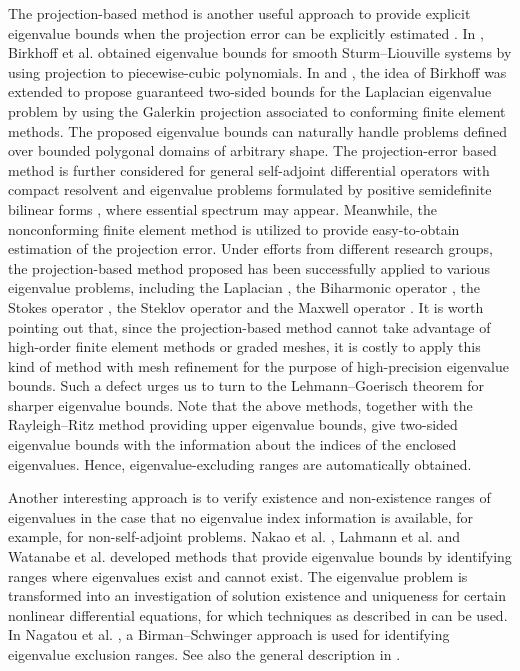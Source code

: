 \documentclass[a4,11pt]{article}
\numberwithin{equation}{section}
\begin{document}
The projection-based method is another useful approach to provide explicit eigenvalue bounds when the projection error can be explicitly estimated \cite{Birkhoff_etal1966, Kikuchi+Liu2007,liu-kikuchi-2010, Liu-Oishi-2013,Liu-2015,Kobayashi2015,carstensenGallistl2014, Carstensen2014}. In \cite{Birkhoff_etal1966}, Birkhoff et al. obtained eigenvalue bounds for smooth Sturm--Liouville systems by using projection to piecewise-cubic polynomials. In  \cite{LiuOis2011} and \cite{Liu-Oishi-2013},  the idea of Birkhoff was extended to propose guaranteed two-sided bounds for the Laplacian eigenvalue problem by using the Galerkin projection associated to conforming finite element methods. The proposed eigenvalue bounds can naturally handle problems defined over bounded polygonal domains of arbitrary shape. The projection-error based method is further considered for general self-adjoint differential operators with compact resolvent \cite{Liu-2015} and  eigenvalue problems formulated by positive semidefinite bilinear forms \cite{You-Xie-Liu-2019,liu2020explicit}, where essential spectrum may appear. Meanwhile, the nonconforming finite element method is utilized to provide easy-to-obtain estimation of the projection error. Under efforts from different research groups, the projection-based method proposed has been successfully applied to various eigenvalue problems, including the Laplacian \cite{Liu-2015,Carstensen2014},  the Biharmonic operator \cite{carstensenGallistl2014,liu2018you,liao2019optimal}, the Stokes operator \cite{xie2018explicit,liu2021explicit}, the Steklov operator \cite{You-Xie-Liu-2019,NakanoLiYueLiu+2023} and the Maxwell operator \cite{gallistl2021computational}. 
%
It is worth pointing out that, since the projection-based method cannot take advantage of high-order finite element methods or graded meshes, it is costly to apply this kind of method with mesh refinement for the purpose of high-precision eigenvalue bounds. Such a defect urges us to turn to the Lehmann--Goerisch theorem for sharper eigenvalue bounds.
%
%
Note that the above methods, together with the Rayleigh--Ritz method providing upper eigenvalue bounds, give two-sided eigenvalue bounds with the information about the 
indices of the enclosed eigenvalues.
%
Hence, eigenvalue-excluding ranges are automatically obtained.

 Another interesting approach is to verify existence and non-existence ranges of eigenvalues in the case that no eigenvalue index information is available,  for example,  for non-self-adjoint problems. 
  Nakao et al. \cite{nakao1999numerical}, Lahmann et al. \cite{lahmann2004computer} and Watanabe et al. \cite{watanabe2009computer, watanabe2011computer,watanabe2014verified} developed methods that provide eigenvalue bounds by identifying ranges where eigenvalues exist and cannot exist. The eigenvalue problem is transformed into an investigation of solution existence and uniqueness for certain nonlinear  differential equations, for which  techniques as described in  \cite{NAKAO1992,plum1993numerical,nakao2019numerical_book} can be used.
  In Nagatou et al. \cite{nagatou2012eigenvalue},  a Birman--Schwinger approach is used for identifying eigenvalue exclusion ranges. 
 See also the general description in \cite[Section 9.3]{nakao2019numerical_book}.
\end{document}
